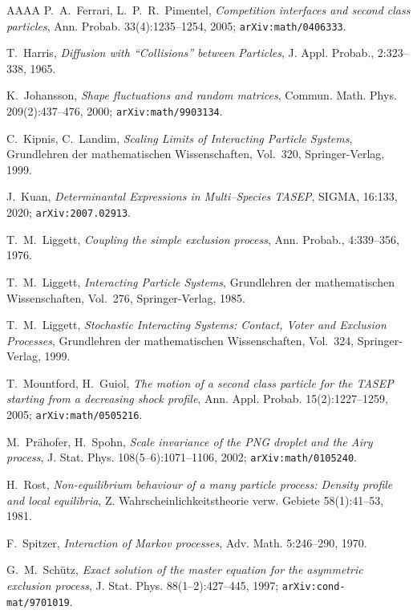 \documentclass[11pt,reqno]{amsart}
\theoremstyle{definition}
\theoremstyle{remark}
\theoremstyle{remark}
\numberwithin{equation}{section}
\begin{document}
\begin{thebibliography}{AAAA}
		P.~A.~Ferrari, L.~P.~R.~Pimentel, \textit{Competition interfaces and second class particles},
		Ann. Probab. 33(4):1235--1254, 2005; {\tt arXiv:math/0406333}.
		
		 T.~Harris, \textit{Diffusion with “Collisions” between Particles}, J. Appl. Probab.,
		2:323--338, 1965.
		
		K.~Johansson, \textit{Shape fluctuations and random matrices},
		Commun. Math. Phys. 209(2):437--476, 2000; {\tt arXiv:math/9903134}.
		
		C.~Kipnis, C.~Landim, \textit{Scaling Limits of Interacting Particle Systems}, Grundlehren der mathematischen Wissenschaften, Vol.~320, Springer-Verlag, 1999.
		
		J.~Kuan, \textit{Determinantal Expressions in Multi--Species TASEP}, SIGMA, 16:133, 2020; {\tt arXiv:2007.02913}.
		
		 T.~M.~Liggett, \textit{Coupling the simple exclusion process}, Ann. Probab.,
		4:339–356, 1976.
		
		T.~M.~Liggett, \textit{Interacting Particle Systems}, Grundlehren der mathematischen Wissenschaften, Vol.~276, Springer-Verlag, 1985.
		
		T.~M.~Liggett, \textit{Stochastic Interacting Systems: Contact, Voter and Exclusion Processes}, Grundlehren der mathematischen Wissenschaften, Vol.~324, Springer-Verlag, 1999.
		
		T.~Mountford, H.~Guiol, \textit{The motion of a second class particle for the TASEP starting from a decreasing shock profile},
		Ann. Appl. Probab. 15(2):1227--1259, 2005; {\tt arXiv:math/0505216}.
		
		M.~Pr{\"a}hofer, H.~Spohn, \textit{Scale invariance of the PNG droplet and the Airy process},
		J. Stat. Phys. 108(5--6):1071--1106, 2002; {\tt arXiv:math/0105240}.
		
		H.~Rost, \textit{Non-equilibrium behaviour of a many particle process: Density profile and local equilibria},
		Z. Wahrscheinlichkeitstheorie verw. Gebiete 58(1):41--53, 1981.
		
		F.~Spitzer, \textit{Interaction of Markov processes}, Adv. Math. 5:246--290, 1970.
		
		G.~M.~Sch{\"u}tz, \textit{Exact solution of the master equation for the asymmetric exclusion process},
		J. Stat. Phys. 88(1--2):427--445, 1997; {\tt arXiv:cond-mat/9701019}.
		

\end{thebibliography}
\end{document}
